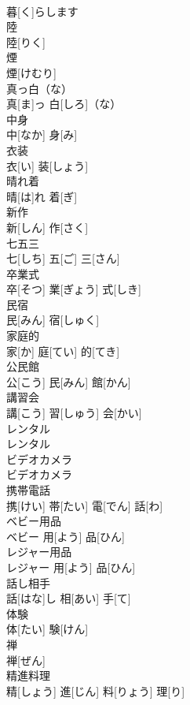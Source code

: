 \documentclass[8pt]{extreport}
\begin{document}
\begin{CJK}{UTF8}{min}
\\	暮[く]らします		
\\	陸	
\\	陸[りく]		
\\	煙	
\\	煙[けむり]		
\\	真っ白（な）	
\\	真[ま]っ 白[しろ]（な）		
\\	中身	
\\	中[なか] 身[み]		
\\	衣装	
\\	衣[い] 装[しょう]		
\\	晴れ着	
\\	晴[は]れ 着[ぎ]		
\\	新作	
\\	新[しん] 作[さく]		
\\	七五三	
\\	七[しち] 五[ご] 三[さん]		
\\	卒業式	
\\	卒[そつ] 業[ぎょう] 式[しき]		
\\	民宿	
\\	民[みん] 宿[しゅく]		
\\	家庭的	
\\	家[か] 庭[てい] 的[てき]		
\\	公民館	
\\	公[こう] 民[みん] 館[かん]		
\\	講習会	
\\	講[こう] 習[しゅう] 会[かい]		
\\	レンタル	
\\	レンタル		
\\	ビデオカメラ	
\\	ビデオカメラ		
\\	携帯電話	
\\	携[けい] 帯[たい] 電[でん] 話[わ]		
\\	ベビー用品	
\\	ベビー 用[よう] 品[ひん]		
\\	レジャー用品	
\\	レジャー 用[よう] 品[ひん]		
\\	話し相手	
\\	話[はな]し 相[あい] 手[て]		
\\	体験	
\\	体[たい] 験[けん]		
\\	禅	
\\	禅[ぜん]		
\\	精進料理	
\\	精[しょう] 進[じん] 料[りょう] 理[り]		

\end{CJK}
\end{document}
